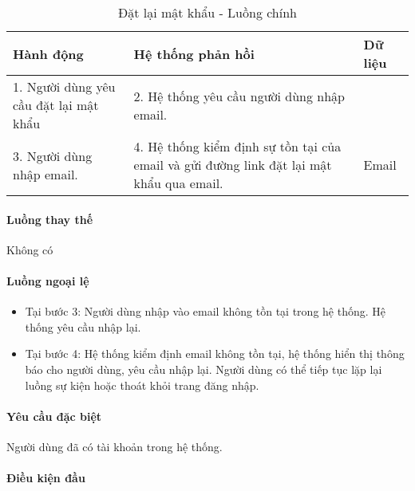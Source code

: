 \documentclass[./../main.tex]{subfiles}
\begin{document}
\begin{table}[H]
	\caption{Đặt lại mật khẩu - Luồng chính}
	\label{tab:reset_password}
	\begin{tabularx}{\textwidth}{|X|X|X|}
		\hline
		\textbf{Hành động}                     & \textbf{Hệ thống phản hồi}                                                               & \textbf{Dữ liệu} \\ \hline
		1. Người dùng yêu cầu đặt lại mật khẩu & 2. Hệ thống yêu cầu người dùng nhập email.                                               &                  \\ \hline
		3. Người dùng nhập email.              & 4. Hệ thống kiểm định sự tồn tại của email và gửi đường link đặt lại mật khẩu qua email. & Email            \\ \hline
	\end{tabularx}
\end{table}

\paragraph*{Luồng thay thế} Không có

\paragraph*{Luồng ngoại lệ}

\begin{itemize}
	\item

	      Tại bước 3: Người dùng nhập vào email không tồn tại trong hệ thống. Hệ
	      thống yêu cầu nhập lại.

	\item

	      Tại bước 4: Hệ thống kiểm định email không tồn tại, hệ thống hiển thị
	      thông báo cho người dùng, yêu cầu nhập lại. Người dùng có thể tiếp tục
	      lặp lại luồng sự kiện hoặc thoát khỏi trang đăng nhập.

\end{itemize}

\paragraph*{Yêu cầu đặc biệt}

Người dùng đã có tài khoản trong hệ thống.

\paragraph*{Điều kiện đầu}
\end{document}
